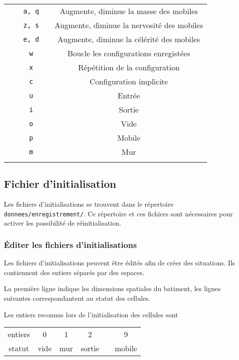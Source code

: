 \begin{center}
\begin{tabular}{ccccc}
 &  & \texttt{a, q} &  & Augmente, diminue la masse des mobiles \\
 &  & \texttt{z, s} &  & Augmente, diminue la nervosité des mobiles \\
 &  & \texttt{e, d} &  & Augmente, diminue la célérité des mobiles \\

 &  & \texttt{w} &  & Boucle les configurations enregistées  \\
 &  & \texttt{x} &  & Répétition de la configuration \\
 &  & \texttt{c} &  & Configuration implicite \\

 &  & \texttt{u} &  & Entrée  \\
 &  & \texttt{i} &  & Sortie \\
 &  & \texttt{o} &  & Vide \\
 &  & \texttt{p} &  & Mobile \\
 &  & \texttt{m} &  & Mur \\
\\
\end{tabular}
\end{center}
%
\subsection{Fichier d'initialisation}
%
Les fichiers d'initialisations se trouvent dans le répertoire \texttt{donnees/enregistrement/}. Ce répertoire et ces fichiers sont nécessaires pour activer les possibilité de réinitialisation.
%
\subsubsection{Éditer les fichiers d'initialisations}
Les fichiers d'initialisations peuvent être édités afin de créer des situations. Ils contiennent des entiers séparés par des espaces.

La première ligne indique les dimensions spatiales du batiment, les lignes suivantes correspondantent au statut des cellules.

Les entiers reconnus lors de l'initialisation des cellules sont

\begin{center}
\begin{tabular}{cccccc}
entiers & 0 & 1 & 2 &  & 9 \\
statut & vide & mur & sortie &  & mobile \\
\end{tabular}
\end{center}
%
